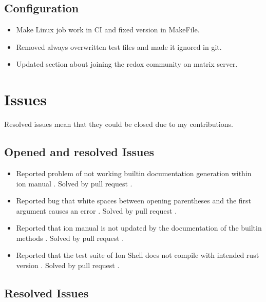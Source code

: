 \subsection{Configuration}

\begin{itemize}
	\item Make Linux job work in CI and fixed version in MakeFile. \cite{pr_conf_partial_ci_fix}
	\item Removed always overwritten test files and made it ignored in git. \cite{pr_conf_overwritten_files}
	\item Updated section about joining the redox community on matrix server. \cite{pr_docs_update_community_links}

\end{itemize}

\section{Issues}

Resolved issues mean that they could be closed due to my contributions.

\subsection{Opened and resolved Issues}

\begin{itemize}
	\item Reported problem of not working builtin documentation generation within ion manual \cite{issue_builtin_generation}. Solved by pull request \cite{pr_man_history_included_ion_manual}.
	\item Reported bug that white spaces between opening parentheses and the first argument causes an error \cite{issue_spaces_between_opening_parentheses}. Solved by pull request \cite{issue_spaces_between_opening_parentheses}.
	\item Reported that ion manual is not updated by the documentation of the builtin methods \cite{issue_ion_manual_not_updated}. Solved by pull request \cite{ion_shell_subst_ion_subst_pr}.
	\item Reported that the test suite of Ion Shell does not compile with intended rust version \cite{issue_bug_test_not_compile}. Solved by pull request \cite{pr_conf_partial_ci_fix}.
\end{itemize}

\subsection{Resolved Issues}

